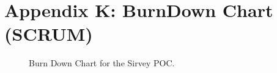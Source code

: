 \documentclass[12pt]{witseiepaper}
\begin{document}
\newpage


\newpage
\section{Appendix K: BurnDown Chart (SCRUM)}
\begin{figure}[H]
	\caption{Burn Down Chart for the Sirvey POC.} 
	\label{fig:BurnDown}
\end{figure}
\end{document}
